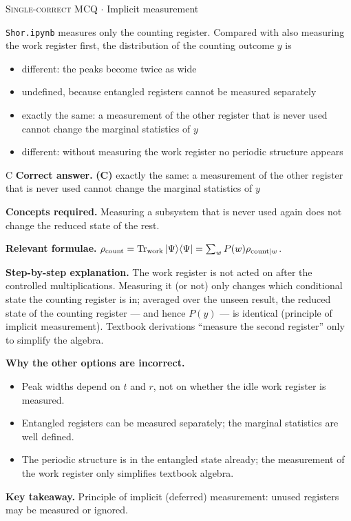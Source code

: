 \documentclass[11pt,a4paper]{article}
\newcommand{\optlabel}[1]{\textbf{(#1)}}
\newcommand{\correctlabel}[1]{\textcolor{okgreen}{\textbf{(#1)}\,\ding{51}}}
\newenvironment{qitem}[1]{\begin{list}{}{\setlength{\leftmargin}{3.3em}\setlength{\labelwidth}{3.1em}%
  \setlength{\labelsep}{0.2em}\setlength{\topsep}{3pt}\setlength{\parsep}{3pt}}\item[\textbf{Q.#1}\hfill]}{\end{list}}
\newcommand{\qsep}{\par\vspace{2pt}{\color{black!15}\hrule}\vspace{4pt}}
\newcommand{\qmeta}[2]{{\footnotesize\color{black!60}\textsc{#1} \;$\cdot$\; #2}\par}
\begin{document}
\begin{qitem}{32}
\qmeta{Single-correct MCQ}{Implicit measurement}
\texttt{Shor.ipynb} measures only the counting register. Compared with also measuring the work register first, the distribution of the counting
outcome $y$ is
\begin{itemize}[leftmargin=2.6em, labelsep=0.4em, itemsep=2pt, topsep=3pt]
\item[\optlabel{A}] different: the peaks become twice as wide
\item[\optlabel{B}] undefined, because entangled registers cannot be measured separately
\item[\correctlabel{C}] exactly the same: a measurement of the other register that is never used cannot change the marginal statistics of $y$
\item[\optlabel{D}] different: without measuring the work register no periodic structure appears
\end{itemize}
\end{qitem}
\begin{solbox}{C}
\textbf{\color{brand}Correct answer.} \textcolor{okgreen}{\textbf{(C)}} exactly the same: a measurement of the other register that is never used cannot change the marginal statistics of $y$

\textbf{\color{brand}Concepts required.} Measuring a subsystem that is never used again does not change the reduced state of the rest.

\textbf{\color{brand}Relevant formulae.} $\rho_{\text{count}} = \operatorname{Tr}_{\text{work}}\ket\Psi\!\bra\Psi = \sum_wP(w)\rho_{\text{count}|w}$.

\textbf{\color{brand}Step-by-step explanation.} The work register is not acted on after the controlled multiplications. Measuring it (or not) only changes which conditional state the counting
register is in; averaged over the unseen result, the reduced state of the counting register --- and hence $P(y)$ --- is identical (principle of implicit
measurement). Textbook derivations ``measure the second register'' only to simplify the algebra.

\textbf{\color{brand}Why the other options are incorrect.}
\begin{itemize}[leftmargin=2.4em, itemsep=1pt, topsep=2pt]
\item[\textbf{(A)}] Peak widths depend on $t$ and $r$, not on whether the idle work register is measured.
\item[\textbf{(B)}] Entangled registers can be measured separately; the marginal statistics are well defined.
\item[\textbf{(D)}] The periodic structure is in the entangled state already; the measurement of the work register only simplifies textbook algebra.
\end{itemize}
\textbf{\color{brand}Key takeaway.} Principle of implicit (deferred) measurement: unused registers may be measured or ignored.
\end{solbox}
\qsep
\end{document}
